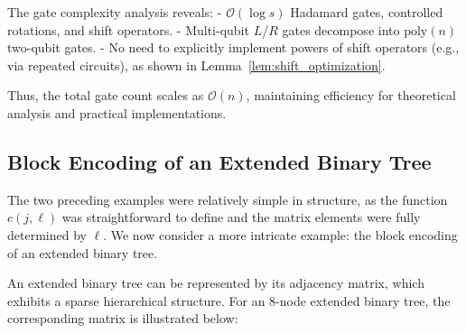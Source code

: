 \documentclass{article}
\begin{document}
    The gate complexity analysis reveals:
    - $\mathcal{O}(\log s)$ Hadamard gates, controlled rotations, and shift operators.
    - Multi-qubit $L$/$R$ gates decompose into $\mathrm{poly}(n)$ two-qubit gates.
    - No need to explicitly implement powers of shift operators (e.g., via repeated circuits), as shown in Lemma~\ref{lem:shift_optimization}.

    Thus, the total gate count scales as $\mathcal{O}(n)$, maintaining efficiency for theoretical analysis and practical implementations.

    \subsection{Block Encoding of an Extended Binary Tree}

    The two preceding examples were relatively simple in structure, as the function $c(j, \ell)$ was straightforward to define and the matrix elements were fully determined by $\ell$. We now consider a more intricate example: the block encoding of an extended binary tree.

    An extended binary tree can be represented by its adjacency matrix, which exhibits a sparse hierarchical structure. For an 8-node extended binary tree, the corresponding matrix is illustrated below:
\end{document}
